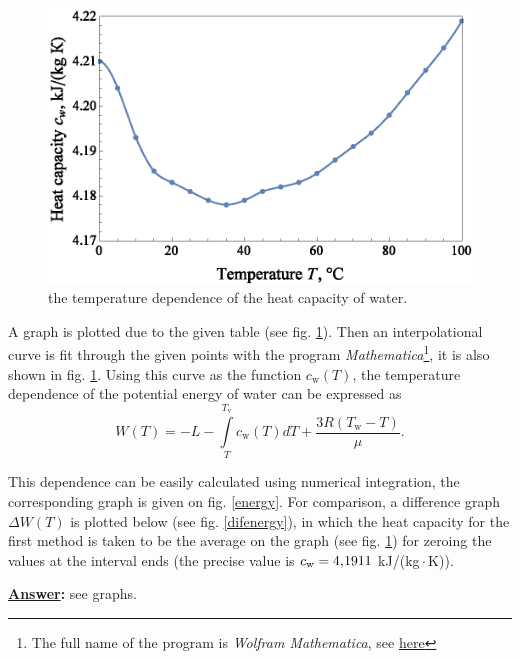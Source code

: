 \begin{figure}
\begin{center}
\vspace{-4mm}
\includegraphics[scale=0.55]{1/fig12eng.eps}
\end{center}
\vspace{-2mm}
\caption{the temperature dependence of the heat capacity of water.}\label{heatcapacity}
\end{figure}

A graph is plotted due to the given table (see fig. \ref{heatcapacity}). Then an interpolational curve is fit through the given points with the program \textit{Mathematica}\footnote{The full name of the program is \textit{Wolfram Mathematica}, see \href{http://www.wolfram.com/mathematica/}{here}}, it is also shown in fig. \ref{heatcapacity}. Using this curve as the function $c_\text{w}(T)$, the temperature dependence of the potential energy of water can be expressed as
$$
  W(T)=-L-\int\limits_T^{T_\text{v}} c_\text{w}(T)dT+\frac{3R\left(T_\text{w}-T\right)}{\mu}.
$$

This dependence can be easily calculated using numerical integration, the corresponding graph is given on fig. \ref{energy}. For comparison, a difference graph $\Delta W(T)$ is plotted below (see fig. \ref{difenergy}), in which the heat capacity for the first method is taken to be the average on the graph (see fig. \ref{heatcapacity}) for zeroing the values at the interval ends (the precise value is $c_\text{w}=4,\hspace{-1.3pt}1911$ kJ/(kg\,$\cdot$\,K)).

\textbf{\underline{Answer}:} see graphs.

